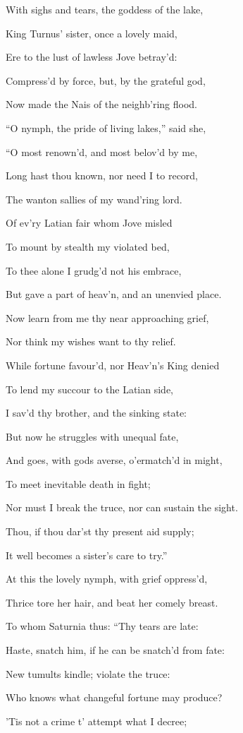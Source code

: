 With sighs and tears, the goddess of the lake,

King Turnus’ sister, once a lovely maid,

Ere to the lust of lawless Jove betray’d:

Compress’d by force, but, by the grateful god,

Now made the Nais of the neighb’ring flood.

“O nymph, the pride of living lakes,” said she,

“O most renown’d, and most belov’d by me,

Long hast thou known, nor need I to record,

The wanton sallies of my wand’ring lord.

Of ev’ry Latian fair whom Jove misled

To mount by stealth my violated bed,

To thee alone I grudg’d not his embrace,

But gave a part of heav’n, and an unenvied place.

Now learn from me thy near approaching grief,

Nor think my wishes want to thy relief.

While fortune favour’d, nor Heav’n’s King denied

To lend my succour to the Latian side,

I sav’d thy brother, and the sinking state:

But now he struggles with unequal fate,

And goes, with gods averse, o’ermatch’d in might,

To meet inevitable death in fight;

Nor must I break the truce, nor can sustain the sight.

Thou, if thou dar’st thy present aid supply;

It well becomes a sister’s care to try.”

At this the lovely nymph, with grief oppress’d,

Thrice tore her hair, and beat her comely breast.

To whom Saturnia thus: “Thy tears are late:

Haste, snatch him, if he can be snatch’d from fate:

New tumults kindle; violate the truce:

Who knows what changeful fortune may produce?

’Tis not a crime t’ attempt what I decree;

